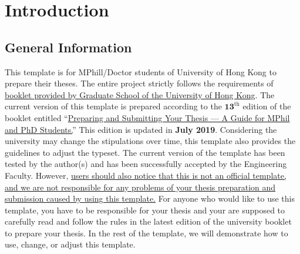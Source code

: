 
\chapter{Introduction} %

\label{Chapter1} %




\section{General Information}
\label{chap1:sec1:general_information}
This template is for MPhill/Doctor students of University of Hong Kong to prepare their theses. The entire project strictly follows the requirements of \uline{booklet provided by Graduate School of the University of Hong Kong}. The current version of this template is prepared according to the $\boldsymbol{13^\mathrm{th}}$ edition of the booklet entitled ``\href{https://intraweb.hku.hk/reserved_1/gradsch/PreparingandSubmittingYourThesis.pdf}{Preparing and Submitting Your Thesis --- A Guide for MPhil and PhD Students.}'' This edition is updated in \textbf{July 2019}. Considering the university may change the stipulations over time, this template also provides the guidelines to adjust the typeset. The current version of the template has been tested by the author(s) and has been successfully accepted by the Engineering Faculty.
However, \uline{users should also notice that this is not an official template, and we are not responsible for any problems of your thesis preparation and submission caused by using this template.} For anyone who would like to use this template, you have to be responsible for your thesis and your are supposed to carefully read and follow the rules in the latest edition of the university booklet to prepare your thesis. In the rest of the template, we will demonstrate how to use, change, or adjust this template.


